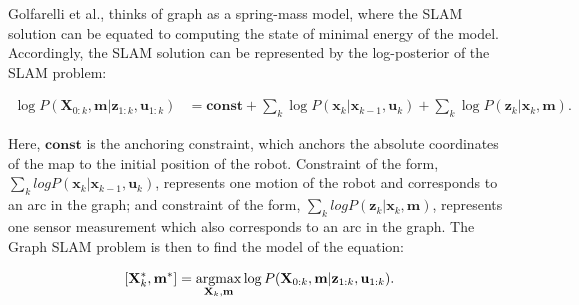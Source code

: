 Golfarelli et al., thinks of graph as a spring-mass model, where the SLAM solution can be equated to computing the state of minimal energy of the model\cite{727315}. Accordingly, the SLAM solution can be represented by the log-posterior of the SLAM problem:

\begin{equation}
\begin{split}
    \log P(\mathbf{X}_{0:k}, \mathbf{m}|\mathbf{z}_{1:k}, \mathbf{u}_{1:k}) &= \mathbf{const} + \sum_{k}\log P(\mathbf{x}_k|\mathbf{x}_{k-1}, \mathbf{u}_k) + \sum_{k}\log P(\mathbf{z}_k|\mathbf{x}_k, \mathbf{m}).
\end{split}
\label{eq:graph4}
\end{equation}

Here, $\mathbf{const}$ is the anchoring constraint, which anchors the absolute coordinates of the map to the initial position of the robot. Constraint of the form, $\sum_{k}log P(\mathbf{x}_k|\mathbf{x}_{k-1}, \mathbf{u}_k)$, represents one motion of the robot and corresponds to an arc in the graph; and constraint of the form, $\sum_{k} log P(\mathbf{z}_k|\mathbf{x}_k, \mathbf{m})$, represents one sensor measurement which also corresponds to an arc in the graph. The Graph SLAM problem is then to find the model of the equation:

\begin{equation}
    [\mathbf{X}_k^*, \mathbf{m}^*] = \argmax_{\mathbf{X}_k , \mathbf{m}} \log P(\mathbf{X}_{0:k}, \mathbf{m}|\mathbf{z}_{1:k}, \mathbf{u}_{1:k}).
\end{equation}

